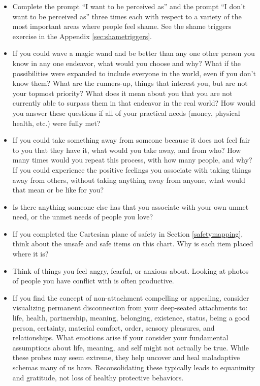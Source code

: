 \documentclass[12pt,letterpaper]{article}
\begin{document}
\begin{itemize}
    \item Complete the prompt “I want to be perceived as” and the prompt “I don't want to be perceived as” three times each with respect to a variety of the most important areas where people feel shame. See the shame triggers exercise in the Appendix \ref{sec:shametriggers}.
    \item If you could wave a magic wand and be better than any one other person you know in any one endeavor, what would you choose and why? What if the possibilities were expanded to include everyone in the world, even if you don't know them? What are the runners-up, things that interest you, but are not your topmost priority? What does it mean about you that you are not currently able to surpass them in that endeavor in the real world? How would you answer these questions if all of your practical needs (money, physical health, etc.) were fully met?
    \item If you could take something away from someone because it does not feel fair to you that they have it, what would you take away, and from who? How many times would you repeat this process, with how many people, and why? If you could experience the positive feelings you associate with taking things away from others, without taking anything away from anyone, what would that mean or be like for you?
    \item Is there anything someone else has that you associate with your own unmet need, or the unmet needs of people you love?
    \item If you completed the Cartesian plane of safety in Section \ref{safetymapping}, think about the unsafe and safe items on this chart. Why is each item placed where it is?
    \item Think of things you feel angry, fearful, or anxious about. Looking at photos of people you have conflict with is often productive.
    \item If you find the concept of non-attachment compelling or appealing, consider visualizing permanent disconnection from your deep-seated attachments to: life, health, partnership, meaning, belonging, existence, status, being a good person, certainty, material comfort, order, sensory pleasures, and relationships. What emotions arise if your consider your fundamental assumptions about life, meaning, and self might not actually be true. While these probes may seem extreme, they help uncover and heal maladaptive schemas many of us have. Reconsolidating these typically leads to equanimity and gratitude, not loss of healthy protective behaviors.

\end{itemize}
\end{document}
